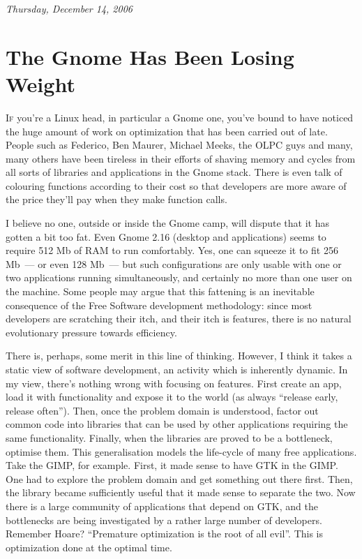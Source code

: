 \documentclass{memoir}
\begin{document}
\begin{flushright}
  \emph{Thursday, December 14, 2006}
\end{flushright}

\section{The Gnome Has Been Losing Weight}

\lettrine{I}{f} you're a Linux head, in particular a Gnome one, you've
bound to have noticed the huge amount of work on optimization that has
been carried out of late. People such as Federico, Ben Maurer, Michael
Meeks, the OLPC guys and many, many others have been tireless in their
efforts of shaving memory and cycles from all sorts of libraries and
applications in the Gnome stack. There is even talk of colouring
functions according to their cost so that developers are more aware of
the price they'll pay when they make function calls.

I believe no one, outside or inside the Gnome camp, will dispute that
it has gotten a bit too fat. Even Gnome 2.16 (desktop and
applications) seems to require 512 Mb of RAM to run comfortably. Yes,
one can squeeze it to fit 256 Mb~--- or even 128 Mb~--- but such
configurations are only usable with one or two applications running
simultaneously, and certainly no more than one user on the
machine. Some people may argue that this fattening is an inevitable
consequence of the Free Software development methodology: since most
developers are scratching their itch, and their itch is features,
there is no natural evolutionary pressure towards efficiency.

There is, perhaps, some merit in this line of thinking. However, I
think it takes a static view of software development, an activity
which is inherently dynamic. In my view, there's nothing wrong with
focusing on features. First create an app, load it with functionality
and expose it to the world (as always ``release early, release
often''). Then, once the problem domain is understood, factor out
common code into libraries that can be used by other applications
requiring the same functionality. Finally, when the libraries are
proved to be a bottleneck, optimise them. This generalisation models
the life-cycle of many free applications. Take the GIMP, for
example. First, it made sense to have GTK in the GIMP. One had to
explore the problem domain and get something out there first. Then,
the library became sufficiently useful that it made sense to separate
the two. Now there is a large community of applications that depend on
GTK, and the bottlenecks are being investigated by a rather large
number of developers. Remember Hoare? ``Premature optimization is the
root of all evil''. This is optimization done at the optimal time.
\end{document}
